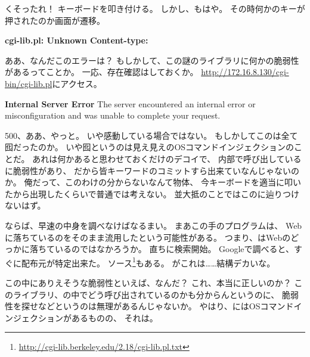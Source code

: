 くそったれ！
キーボードを叩き付ける。
しかし、もはや。
その時何かのキーが押されたのか画面が遷移。

\begin{screen}
\textbf{cgi-lib.pl: Unknown Content-type: }
\end{screen}

ああ、なんだこのエラーは？
もしかして、この謎のライブラリに何かの脆弱性があるってことか。
一応、存在確認はしておくか。
\url{http://172.16.8.130/cgi-bin/cgi-lib.pl}にアクセス。

\begin{itembox}[c]{\textbf{Internal Server Error}}
The server encountered an internal error or misconfiguration and 
was unable to complete your request.
\end{itembox}

500、ああ、やっと。
いや感動している場合ではない。
もしかしてこのは全て囮だったのか。
いや囮というのは見え見えのOSコマンドインジェクションのことだ。
あれは何かあると思わせておくだけのデコイで、
内部で呼び出しているに脆弱性があり、
だから皆キーワードのコミットすら出来ていなんじゃないのか。
俺だって、このわけの分からないなんて物体、
今キーボードを適当に叩いたから出現したくらいで普通では考えない。
並大抵のことではこのに辿りつけないはず。

ならば、早速の中身を調べなけばなるまい。
まあこの手のプログラムは、
Webに落ちているのをそのまま流用したという可能性がある。
つまり、はWebのどっかに落ちているのではなかろうか。
直ちに検索開始。
Googleで調べると、すぐに配布元が特定出来た。
ソース\footnote{\url{http://cgi-lib.berkeley.edu/2.18/cgi-lib.pl.txt}}もある。
がこれは……結構デカいな。

この中にありえそうな脆弱性といえば、なんだ？
これ、本当に正しいのか？
このライブラリ、の中でどう呼び出されているのかも分からんというのに、
脆弱性を探せなどというのは無理があるんじゃないか。
やはり、にはOSコマンドインジェクションがあるものの、
それは。

